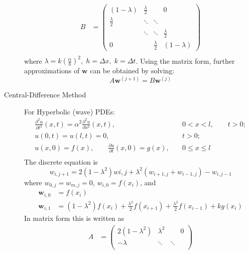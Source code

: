 \documentclass[8pt]{article}
\begin{document}
\begin{multicols}{2}
\begin{description}
\begin{equation*}
\begin{aligned}
        B&=
        \begin{pmatrix}
          (1-\lambda) & \frac{\lambda}{2} & & 0\\
          \frac{\lambda}{2} & \ddots & \ddots & \\
          & \ddots & \ddots & \frac{\lambda}{2}\\
          0 & & \frac{\lambda}{2} & (1-\lambda)
        \end{pmatrix} \\
      \end{aligned}
    \end{equation*}
    where $\lambda = k\left(\frac{\alpha}{h}\right)^2,\;h=\Delta
    x,\;k=\Delta t$. Using the matrix form, further approximations of
    $\mathbf{w}$ can be obtained by solving:
    $$ A\mathbf{w}^{(j+1)} = B\mathbf{w}^{(j)} $$
  \item[Central-Difference Method] For Hyperbolic (wave) PDEs:
    \begin{equation*}
      \begin{aligned}
        &\frac{\partial^2u}{\partial t^2}(x,t) =
        \alpha^2\frac{\partial^2u}{\partial x^2}(x,t),
        &0<x<l, \qquad t>0; \\
        &u(0,t)=u(l,t)=0,\quad &t>0; \\
        &u(x,0)=f(x),\qquad \frac{\partial u}{\partial t}(x,0)=g(x), \quad &0\leq x\leq
        l& \\ 
      \end{aligned}
    \end{equation*}
    The discrete equation is 
    $$ w_{i,j+1} = 2(1-\lambda^2)w{i,j} + \lambda^2(w_{i+1,j}+w_{i-1,j})-w_{i,j-1} $$
    where $w_{0,j}=w_{m,j}=0$, $w_{i,0}=f(x_i)$, and 
    \begin{equation*}
      \begin{aligned}
        \mathbf{w}_{i,0} &= f(x_i) \\
        \mathbf{w}_{i,1} &=
        (1-\lambda^2)f(x_i)+\frac{\lambda^2}{2}f(x_{i+1}) +
        \frac{\lambda^2}{2}f(x_{i-1}) + kg(x_i)
      \end{aligned}
    \end{equation*}
    In matrix form this is written as
    \begin{equation*}
      \begin{aligned}
        A&=
        \begin{pmatrix}
            2(1-\lambda^2) & \lambda^2 & & 0\\
            -\lambda& \ddots & \ddots & \\

\end{pmatrix}
\end{aligned}
\end{equation*}
\end{description}
\end{multicols}
\end{document}
